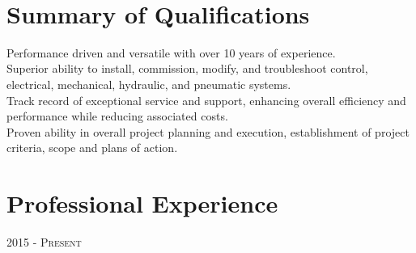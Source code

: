 \documentclass[10pt]{article} %
\begin{document}
\color{text1} %


\par{ \\
\color{headings}\par}
	
\begin{minipage}[t]{0.5\textwidth} %
\vspace{0pt} %

\section{Summary of Qualifications}
\smallskip
\textbullet Performance driven and versatile with over 10 years of experience.\\
\textbullet Superior ability to install, commission, modify, and troubleshoot control, electrical, mechanical, hydraulic, and pneumatic systems. \\
\textbullet Track record of exceptional service and support, enhancing overall efficiency and performance while reducing associated costs. \\ 
\textbullet Proven ability in overall project planning and execution, 
establishment of project criteria, scope and plans of action. \\
\smallskip

\section{Professional Experience}


{\raggedleft\textsc{2015 - Present}\par}


\end{minipage}
\end{document}
